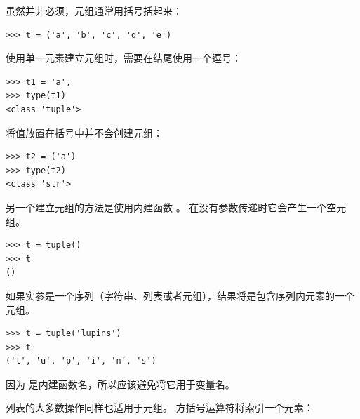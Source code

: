 虽然并非必须，元组通常用括号括起来：


\begin{lstlisting}
>>> t = ('a', 'b', 'c', 'd', 'e')
\end{lstlisting}
%

使用单一元素建立元组时，需要在结尾使用一个逗号：


\begin{lstlisting}
>>> t1 = 'a',
>>> type(t1)
<class 'tuple'>
\end{lstlisting}
%

将值放置在括号中并不会创建元组：

\begin{lstlisting}
>>> t2 = ('a')
>>> type(t2)
<class 'str'>
\end{lstlisting}
%

另一个建立元组的方法是使用内建函数 。  
在没有参数传递时它会产生一个空元组。

\begin{lstlisting}
>>> t = tuple()
>>> t
()
\end{lstlisting}

%

如果实参是一个序列（字符串、列表或者元组），结果将是包含序列内元素的一个元组。

\begin{lstlisting}
>>> t = tuple('lupins')
>>> t
('l', 'u', 'p', 'i', 'n', 's')
\end{lstlisting}
%

因为  是内建函数名，所以应该避免将它用于变量名。



列表的大多数操作同样也适用于元组。 方括号运算符将索引一个元素：


